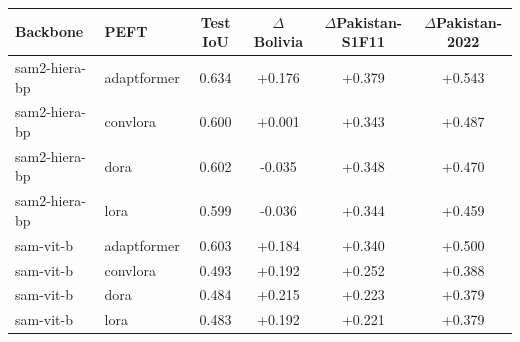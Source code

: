 \begin{tabular}{llcccc}
\toprule
Backbone & PEFT & Test IoU & $\Delta$Bolivia & $\Delta$Pakistan-S1F11 & $\Delta$Pakistan-2022 \\
\midrule
sam2-hiera-bp & adaptformer & 0.634 & +0.176 & +0.379 & +0.543 \\
sam2-hiera-bp & convlora & 0.600 & +0.001 & +0.343 & +0.487 \\
sam2-hiera-bp & dora & 0.602 & -0.035 & +0.348 & +0.470 \\
sam2-hiera-bp & lora & 0.599 & -0.036 & +0.344 & +0.459 \\
sam-vit-b & adaptformer & 0.603 & +0.184 & +0.340 & +0.500 \\
sam-vit-b & convlora & 0.493 & +0.192 & +0.252 & +0.388 \\
sam-vit-b & dora & 0.484 & +0.215 & +0.223 & +0.379 \\
sam-vit-b & lora & 0.483 & +0.192 & +0.221 & +0.379 \\
\bottomrule
\end{tabular}

